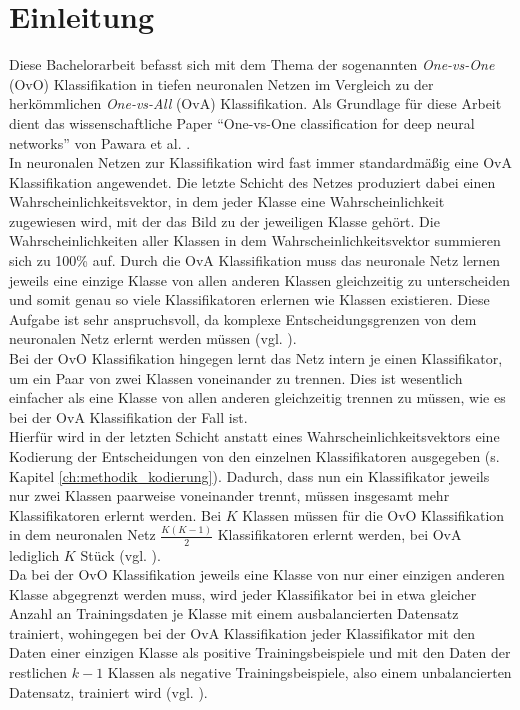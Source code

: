 \chapter{Einleitung}
\label{ch:einleitung}


Diese Bachelorarbeit befasst sich mit dem Thema der sogenannten \textit{One-vs-One} (OvO) Klassifikation in tiefen neuronalen Netzen im Vergleich zu der herkömmlichen \textit{One-vs-All} (OvA) Klassifikation. Als Grundlage für diese Arbeit dient das wissenschaftliche Paper \enquote{One-vs-One classification for deep neural networks} von Pawara et al. \cite{pawaraPaper}.\\

In neuronalen Netzen zur Klassifikation wird fast immer standardmäßig eine OvA Klassifikation angewendet. Die letzte Schicht des Netzes produziert dabei einen Wahrscheinlichkeitsvektor, in dem jeder Klasse eine Wahrscheinlichkeit zugewiesen wird, mit der das Bild zu der jeweiligen Klasse gehört. Die Wahrscheinlichkeiten aller Klassen in dem Wahrscheinlichkeitsvektor summieren sich zu 100\% auf. Durch die OvA Klassifikation muss das neuronale Netz lernen jeweils eine einzige Klasse von allen anderen Klassen gleichzeitig zu unterscheiden und somit genau so viele Klassifikatoren erlernen wie Klassen existieren. Diese Aufgabe ist sehr anspruchsvoll, da komplexe Entscheidungsgrenzen von dem neuronalen Netz erlernt werden müssen (vgl. \cite{pawaraPaper}).\\

Bei der OvO Klassifikation hingegen lernt das Netz intern je einen Klassifikator, um ein Paar von zwei Klassen voneinander zu trennen. Dies ist wesentlich einfacher als eine Klasse von allen anderen gleichzeitig trennen zu müssen, wie es bei der OvA Klassifikation der Fall ist.\\

Hierfür wird in der letzten Schicht anstatt eines Wahrscheinlichkeitsvektors eine Kodierung der Entscheidungen von den einzelnen Klassifikatoren ausgegeben (s. Kapitel \ref{ch:methodik_kodierung}).
Dadurch, dass nun ein Klassifikator jeweils nur zwei Klassen paarweise voneinander trennt, müssen insgesamt mehr Klassifikatoren erlernt werden.
Bei $K$ Klassen müssen für die OvO Klassifikation in dem neuronalen Netz $\frac{K(K-1)}{2}$ Klassifikatoren erlernt werden, bei OvA lediglich $K$ Stück (vgl. \cite{pawaraPaper}).\\

Da bei der OvO Klassifikation jeweils eine Klasse von nur einer einzigen anderen Klasse abgegrenzt werden muss, wird jeder Klassifikator bei in etwa gleicher Anzahl an Trainingsdaten je Klasse mit einem ausbalancierten Datensatz trainiert, wohingegen bei der OvA Klassifikation jeder Klassifikator mit den Daten einer einzigen Klasse als positive Trainingsbeispiele und mit den Daten der restlichen $k-1$ Klassen als negative Trainingsbeispiele, also einem unbalancierten Datensatz, trainiert wird (vgl. \cite{pawaraPaper}).\\


